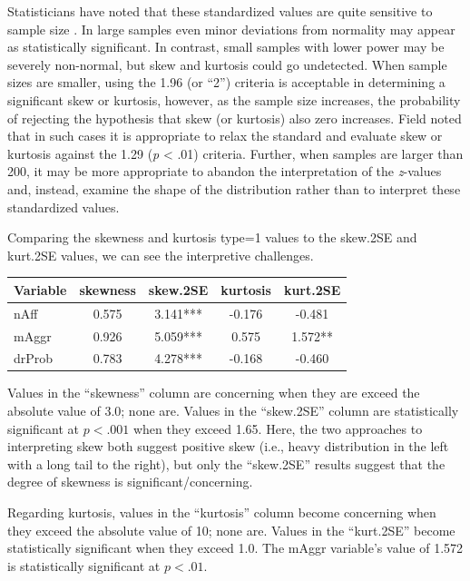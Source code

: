 \documentclass[
  11pt,
]{book}
\begin{document}
Statisticians have noted that these standardized values are quite sensitive to sample size \citep{field_discovering_2012, kline_data_2016}. In large samples even minor deviations from normality may appear as statistically significant. In contrast, small samples with lower power may be severely non-normal, but skew and kurtosis could go undetected. When sample sizes are smaller, using the 1.96 (or ``2'') criteria is acceptable in determining a significant skew or kurtosis, however, as the sample size increases, the probability of rejecting the hypothesis that skew (or kurtosis) also zero increases. Field \citeyearpar{field_discovering_2012} noted that in such cases it is appropriate to relax the standard and evaluate skew or kurtosis against the 1.29 (\emph{p} \textless{} .01) criteria. Further, when samples are larger than 200, it may be more appropriate to abandon the interpretation of the \emph{z}-values and, instead, examine the shape of the distribution rather than to interpret these standardized values.

Comparing the skewness and kurtosis type=1 values to the skew.2SE and kurt.2SE values, we can see the interpretive challenges.

\begin{longtable}[]{@{}lcccc@{}}
\toprule\noalign{}
Variable & skewness & skew.2SE & kurtosis & kurt.2SE \\
\midrule\noalign{}
\endhead
\bottomrule\noalign{}
\endlastfoot
nAff & 0.575 & 3.141*** & -0.176 & -0.481 \\
mAggr & 0.926 & 5.059*** & 0.575 & 1.572** \\
drProb & 0.783 & 4.278*** & -0.168 & -0.460 \\
\end{longtable}

Values in the ``skewness'' column are concerning when they are exceed the absolute value of 3.0; none are. Values in the ``skew.2SE'' column are statistically significant at \(p < .001\) when they exceed 1.65. Here, the two approaches to interpreting skew both suggest positive skew (i.e., heavy distribution in the left with a long tail to the right), but only the ``skew.2SE'' results suggest that the degree of skewness is significant/concerning.

Regarding kurtosis, values in the ``kurtosis'' column become concerning when they exceed the absolute value of 10; none are. Values in the ``kurt.2SE'' become statistically significant when they exceed 1.0. The mAggr variable's value of 1.572 is statistically significant at \(p < .01\).
\end{document}
